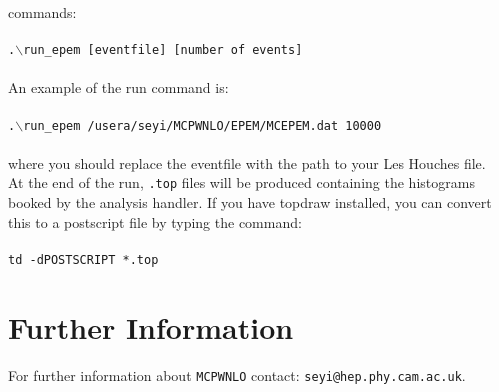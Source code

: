 \documentclass[12pt,a4paper,oneside]{article}
\begin{document}
commands: \\
\\
{\tt .$\backslash$run\_epem [eventfile] [number of events]} \\
\\
An example of the run
command is:\\
\\
{\tt .$\backslash$run\_epem /usera/seyi/MCPWNLO/EPEM/MCEPEM.dat 10000}\\
\\
where you should replace the eventfile with the path to your Les Houches file.
\\
  At the end of the run, {\tt .top} files will be
  produced containing the histograms booked by the analysis handler. If you have topdraw
  installed, you can convert this to a postscript file by typing the command:\\
\\
{\tt td -dPOSTSCRIPT  *.top}
\section{Further Information}
For further information about {\tt MCPWNLO} contact: {\tt seyi@hep.phy.cam.ac.uk}.


\end{document}
